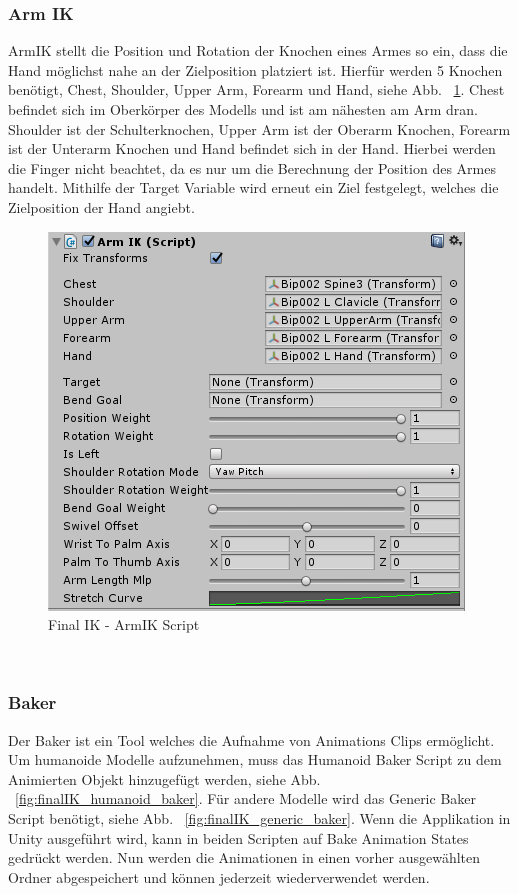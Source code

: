 \subsubsection{Arm IK}
ArmIK stellt die Position und Rotation der Knochen eines Armes so ein, dass die Hand möglichst nahe an der Zielposition platziert ist.
Hierfür werden 5 Knochen benötigt, Chest, Shoulder, Upper Arm, Forearm und Hand, siehe Abb. ~\ref{fig:finalIK_armIK_script}.
Chest befindet sich im Oberkörper des Modells und ist am nähesten am Arm dran.
Shoulder ist der Schulterknochen, Upper Arm ist der Oberarm Knochen, Forearm ist der Unterarm Knochen und Hand befindet sich in der Hand.
Hierbei werden die Finger nicht beachtet, da es nur um die Berechnung der Position des Armes handelt.
Mithilfe der Target Variable wird erneut ein Ziel festgelegt, welches die Zielposition der Hand angiebt.
\begin {figure}
    \centering
    \includegraphics[scale=1]{pics/finalik_armik_script}
    \caption{Final IK - ArmIK Script}
    \label{fig:finalIK_armIK_script}
\end {figure}
~\cite{FinalIK_ArmIK_2021}

\subsubsection{Baker}
Der Baker ist ein Tool welches die Aufnahme von Animations Clips ermöglicht.
Um humanoide Modelle aufzunehmen, muss das Humanoid Baker Script zu dem Animierten Objekt hinzugefügt werden, siehe Abb. ~\ref{fig:finalIK_humanoid_baker}.
Für andere Modelle wird das Generic Baker Script benötigt, siehe Abb. ~\ref{fig:finalIK_generic_baker}.
Wenn die Applikation in Unity ausgeführt wird, kann in beiden Scripten auf Bake Animation States gedrückt werden.
Nun werden die Animationen in einen vorher ausgewählten Ordner abgespeichert und können jederzeit wiederverwendet werden.

